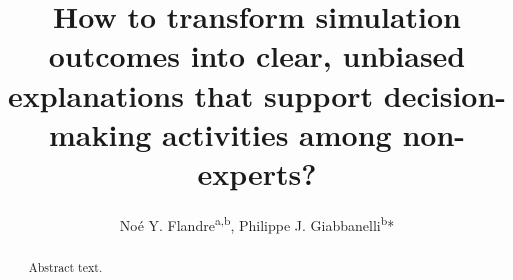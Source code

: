\documentclass[preprint,12pt]{elsarticle}
\begin{document}
\begin{frontmatter}



\title{How to transform simulation outcomes into clear, unbiased explanations that support decision-making activities among non-experts?
}


            


\author{Noé Y. Flandre\textsuperscript{a,b}, Philippe J. Giabbanelli\textsuperscript{b}*}



\begin{abstract}
Abstract text.
\end{abstract}

\begin{graphicalabstract}
\end{graphicalabstract}


\end{frontmatter}
\end{document}

